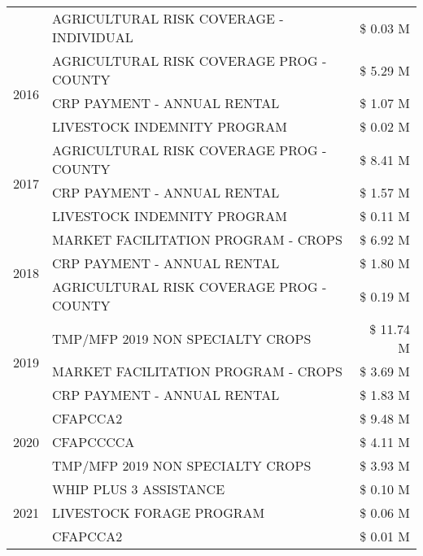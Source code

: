 \begin{tabular}{llr}
 & AGRICULTURAL RISK COVERAGE - INDIVIDUAL & \$ 0.03 M \\
\cline{1-3}
\multirow[t]{3}{*}{2016} & AGRICULTURAL RISK COVERAGE PROG - COUNTY & \$ 5.29 M \\
 & CRP PAYMENT - ANNUAL RENTAL & \$ 1.07 M \\
 & LIVESTOCK INDEMNITY PROGRAM & \$ 0.02 M \\
\cline{1-3}
\multirow[t]{3}{*}{2017} & AGRICULTURAL RISK COVERAGE PROG - COUNTY & \$ 8.41 M \\
 & CRP PAYMENT - ANNUAL RENTAL & \$ 1.57 M \\
 & LIVESTOCK INDEMNITY PROGRAM & \$ 0.11 M \\
\cline{1-3}
\multirow[t]{3}{*}{2018} & MARKET FACILITATION PROGRAM - CROPS & \$ 6.92 M \\
 & CRP PAYMENT - ANNUAL RENTAL & \$ 1.80 M \\
 & AGRICULTURAL RISK COVERAGE PROG - COUNTY & \$ 0.19 M \\
\cline{1-3}
\multirow[t]{3}{*}{2019} & TMP/MFP 2019 NON SPECIALTY CROPS & \$ 11.74 M \\
 & MARKET FACILITATION PROGRAM - CROPS & \$ 3.69 M \\
 & CRP PAYMENT - ANNUAL RENTAL & \$ 1.83 M \\
\cline{1-3}
\multirow[t]{3}{*}{2020} & CFAPCCA2 & \$ 9.48 M \\
 & CFAPCCCCA & \$ 4.11 M \\
 & TMP/MFP 2019 NON SPECIALTY CROPS & \$ 3.93 M \\
\cline{1-3}
\multirow[t]{3}{*}{2021} & WHIP PLUS 3 ASSISTANCE & \$ 0.10 M \\
 & LIVESTOCK FORAGE PROGRAM & \$ 0.06 M \\
 & CFAPCCA2 & \$ 0.01 M \\
\cline{1-3}
\bottomrule
\end{tabular}
